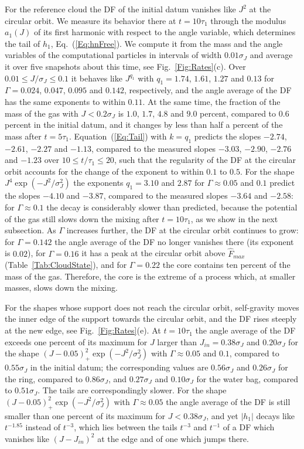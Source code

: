 For the reference cloud the DF of the initial datum vanishes like $J^2$ at the circular orbit. We measure its behavior there at $t = 10\tau_1$ through the modulus $a_1(J)$ of its first harmonic with respect to the angle variable, which determines the tail of $h_1$, Eq.~(\ref{Eq:hnFree}). We compute it from the mass and the angle variables of the computational particles in intervals of width $0.01\sigma_J$ and average it over five snapshots about this time, see Fig.~\ref{Fig:Rates}(c). Over $0.01\leq J/\sigma_J\leq 0.1$ it behaves like $J^{q_1}$ with $q_1 = 1.74$, $1.61$, $1.27$ and $0.13$ for $\Gamma = 0.024$, $0.047$, $0.095$ and $0.142$, respectively, and the angle average of the DF has the same exponents to within $0.11$. At the same time, the fraction of the mass of the gas with $J < 0.2\sigma_J$ is $1.0$, $1.7$, $4.8$ and $9.0$ percent, compared to $0.6$ percent in the initial datum, and it changes by less than half a percent of the mass after $t = 5\tau_1$. Equation~(\ref{Eq:Tail}) with $k = q_1$ predicts the slopes $-2.74$, $-2.61$, $-2.27$ and $-1.13$, compared to the measured slopes $-3.03$, $-2.90$, $-2.76$ and $-1.23$ over $10\leq t/\tau_1\leq 20$, such that the regularity of the DF at the circular orbit accounts for the change of the exponent to within $0.1$ to $0.5$. For the shape $J^4\exp(-J^2/\sigma_J^2)$ the exponents $q_1 = 3.10$ and $2.87$ for $\Gamma\approx 0.05$ and $0.1$ predict the slopes $-4.10$ and $-3.87$, compared to the measured slopes $-3.64$ and $-2.58$: for $\Gamma\approx 0.1$ the decay is considerably slower than predicted, because the potential of the gas still slows down the mixing after $t = 10\tau_1$, as we show in the next subsection. As $\Gamma$ increases further, the DF at the circular orbit continues to grow: for $\Gamma = 0.142$ the angle average of the DF no longer vanishes there (its exponent is $0.02$), for $\Gamma = 0.16$ it has a peak at the circular orbit above $\hat{F}_{max}$ (Table~\ref{Tab:CloudState}), and for $\Gamma = 0.22$ the core contains ten percent of the mass of the gas. Therefore, the core is the extreme of a process which, at smaller masses, slows down the mixing.

For the shapes whose support does not reach the circular orbit, self-gravity moves the inner edge of the support towards the circular orbit, and the DF rises steeply at the new edge, see Fig.~\ref{Fig:Rates}(e). At $t = 10\tau_1$ the angle average of the DF exceeds one percent of its maximum for $J$ larger than $J_{in} = 0.38\sigma_J$ and $0.20\sigma_J$ for the shape $(J - 0.05)_+^2\exp(-J^2/\sigma_J^2)$ with $\Gamma\approx 0.05$ and $0.1$, compared to $0.55\sigma_J$ in the initial datum; the corresponding values are $0.56\sigma_J$ and $0.26\sigma_J$ for the ring, compared to $0.86\sigma_J$, and $0.27\sigma_J$ and $0.10\sigma_J$ for the water bag, compared to $0.51\sigma_J$. The tails are correspondingly slower. For the shape $(J - 0.05)_+^2\exp(-J^2/\sigma_J^2)$ with $\Gamma\approx 0.05$ the angle average of the DF is still smaller than one percent of its maximum for $J < 0.38\sigma_J$, and yet $|h_1|$ decays like $t^{-1.85}$ instead of $t^{-3}$, which lies between the tails $t^{-3}$ and $t^{-1}$ of a DF which vanishes like $(J - J_{in})^2$ at the edge and of one which jumps there.


